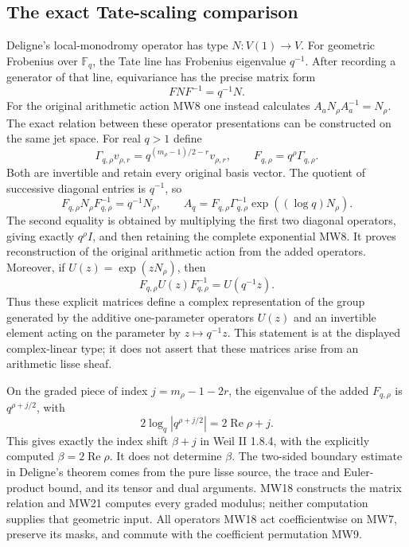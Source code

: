 \subsection{The exact Tate-scaling comparison}

Deligne's local-monodromy operator has type \(N:V(1)\to V\).
For geometric Frobenius over \(\mathbb F_q\), the Tate line has
Frobenius eigenvalue \(q^{-1}\). After recording a generator of
that line, equivariance has the precise matrix form
\[
             FNF^{-1}=q^{-1}N .
 \tag{MW17}
\]
For the original arithmetic action MW8 one instead calculates
\(A_aN_\rho A_a^{-1}=N_\rho\). The exact relation between these
operator presentations can be constructed on the same jet space.
For real \(q>1\) define
\[
 \Gamma_{q,\rho}v_{\rho,r}
   =q^{(m_\rho-1)/2-r}v_{\rho,r},\qquad
 F_{q,\rho}=q^\rho\Gamma_{q,\rho}.
 \tag{MW18}
\]
Both are invertible and retain every original basis vector.
The quotient of successive diagonal entries is \(q^{-1}\), so
\[
 F_{q,\rho}N_\rho F_{q,\rho}^{-1}=q^{-1}N_\rho,\qquad
 A_q=F_{q,\rho}\Gamma_{q,\rho}^{-1}
                     \exp((\log q)N_\rho).
 \tag{MW19}
\]
The second equality is obtained by multiplying the first two
diagonal operators, giving exactly \(q^\rho I\), and then retaining
the complete exponential MW8. It proves reconstruction of the
original arithmetic action from the added operators.
Moreover, if \(U(z)=\exp(zN_\rho)\), then
\[
 F_{q,\rho}U(z)F_{q,\rho}^{-1}=U(q^{-1}z).
 \tag{MW20}
\]
Thus these explicit matrices define a complex representation of the
group generated by the additive one-parameter operators \(U(z)\)
and an invertible element acting on the parameter by \(z\mapsto
q^{-1}z\). This statement is at the displayed complex-linear
type; it does not assert that these matrices arise from an
arithmetic lisse sheaf.

On the graded piece of index \(j=m_\rho-1-2r\), the eigenvalue
of the added \(F_{q,\rho}\) is \(q^{\rho+j/2}\), with
\[
 2\log_q|q^{\rho+j/2}|=2\operatorname{Re}\rho+j .
 \tag{MW21}
\]
This gives exactly the index shift \(\beta+j\) in Weil II 1.8.4,
with the explicitly computed \(\beta=2\operatorname{Re}\rho\).
It does not determine \(\beta\). The two-sided boundary estimate in
Deligne's theorem comes from the pure lisse source, the trace and
Euler-product bound, and its tensor and dual arguments. MW18
constructs the matrix relation and MW21 computes every graded
modulus; neither computation supplies that geometric input.
All operators MW18 act coefficientwise on MW7, preserve its masks,
and commute with the coefficient permutation MW9.

